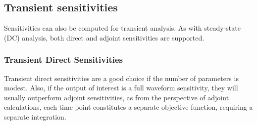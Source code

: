 \subsection{Transient sensitivities}
Sensitivities can also be computed for transient analysis.  As with steady-state (DC) 
analysis, both direct and adjoint sensitivities are supported.

\subsubsection{Transient Direct Sensitivities}
Transient direct sensitivities are a good choice if the number of parameters is 
modest.  Also, if the output of interest is a full waveform sensitivity, they 
will usually outperform adjoint sensitivities, as from the perspective of 
adjoint calculations, each time point constitutes a separate objective function, 
requiring a separate integration.


